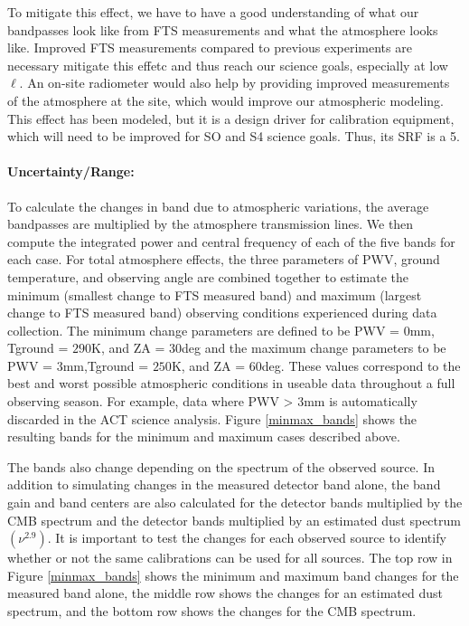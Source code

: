 To mitigate this effect, we have to have a good understanding of what our bandpasses look like from FTS measurements and what the atmosphere looks like. Improved FTS measurements compared to previous experiments are necessary mitigate this effetc and thus reach our science goals, especially at low~$\ell$. An on-site radiometer would also help by providing improved measurements of the atmosphere at the site, which would improve our atmospheric modeling. This effect has been modeled, but it is a design driver for calibration equipment, which will need to be improved for SO and S4 science goals. Thus, its SRF is a 5.

\paragraph{Uncertainty/Range:}
To calculate the changes in band due to atmospheric variations, the average bandpasses are multiplied by the atmosphere transmission lines.  We then compute the integrated power and central frequency of each of the five bands for each case.  For total atmosphere effects, the three parameters of PWV, ground temperature, and observing angle are combined together to estimate the minimum (smallest change to FTS measured band) and maximum (largest change to FTS measured band) observing conditions experienced during data collection.  The minimum change parameters are defined to be PWV = $0$mm, Tground = $290$K, and ZA = $30$deg and the maximum change parameters to be PWV = $3$mm,Tground = $250$K, and ZA = $60$deg.  These values correspond to the best and worst possible atmospheric conditions in useable data throughout a full observing season.  For example, data where PWV > 3mm is automatically discarded in the ACT science analysis.  Figure \ref{minmax_bands} shows the resulting bands for the minimum and maximum cases described above.  

The bands also change depending on the spectrum of the observed source.  In addition to simulating changes in the measured detector band alone, the band gain and band centers are also calculated for the detector bands multiplied by the CMB spectrum and the detector bands multiplied by an estimated dust spectrum $(\nu^{2.9})$.  It is important to test the changes for each observed source to identify whether or not the same calibrations can be used for all sources.  The top row in Figure \ref{minmax_bands} shows the minimum and maximum band changes for the measured band alone, the middle row shows the changes for an estimated dust spectrum, and the bottom row shows the changes for the CMB spectrum.

